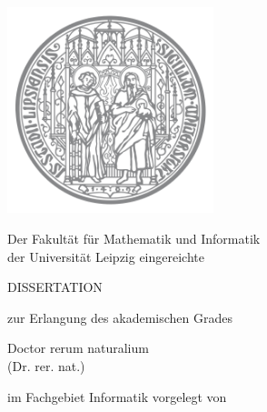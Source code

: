 
\renewcommand{\today}{\ifnum\number\day<10 0\fi \number\day.\space%
\ifcase \month \or Januar \or Februar \or März \or April \or Mai %
\or Juni \or Juli \or August \or September \or Oktober \or November \or Dezember \fi %
\number \year} 

\begin{titlepage}
	\begin{addmargin}[-1cm]{-3cm}
    \begin{center}
        \large  

        \hfill

        \vfill

        \begingroup
            \color{Maroon}\LARGE{\spacedallcaps{\myTitle}} \\ \bigskip
        \endgroup
        
        \includegraphics[width=6cm]{figures/University_of_Leipzig.png} \\ \medskip
    
        Der Fakultät für Mathematik und Informatik \\
        der Universität Leipzig eingereichte \\\vfill
        
        {\Huge DISSERTATION} \vfill\medskip
    
        zur Erlangung des akademischen Grades \\\vfill
        
        {\LARGE Doctor rerum naturalium}\\
        (Dr. rer. nat.)\\\vfill
        
        im Fachgebiet Informatik vorgelegt von\\\vfill
        

\end{center}
\end{addmargin}
\end{titlepage}
